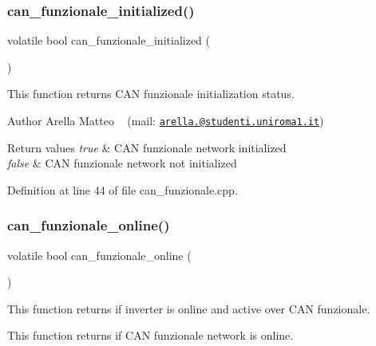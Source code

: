 \subsubsection{\texorpdfstring{can\+\_\+funzionale\+\_\+initialized()}{can\_funzionale\_initialized()}}
{\footnotesize\ttfamily volatile bool can\+\_\+funzionale\+\_\+initialized (\begin{DoxyParamCaption}{ }\end{DoxyParamCaption})}



This function returns C\+AN funzionale initialization status. 

\begin{DoxyAuthor}{Author}
Arella Matteo ~\newline
 (mail\+: \href{mailto:arella.1646983@studenti.uniroma1.it}{\tt arella.@studenti.\+uniroma1.\+it})
\end{DoxyAuthor}

\begin{DoxyRetVals}{Return values}
{\em true} & C\+AN funzionale network initialized \\
\hline
{\em false} & C\+AN funzionale network not initialized \\
\hline
\end{DoxyRetVals}


Definition at line 44 of file can\+\_\+funzionale.\+cpp.

\mbox{\label{group___c_a_n__funzionale__group_ga7d74fd826c5df3b86fd751f91c61671f}} 
\subsubsection{\texorpdfstring{can\+\_\+funzionale\+\_\+online()}{can\_funzionale\_online()}}
{\footnotesize\ttfamily volatile bool can\+\_\+funzionale\+\_\+online (\begin{DoxyParamCaption}{ }\end{DoxyParamCaption})}



This function returns if inverter is online and active over C\+AN funzionale. 

This function returns if C\+AN funzionale network is online.

